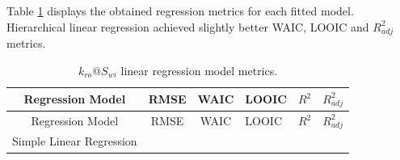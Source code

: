 \documentclass[english,msc,numbers]{coppe}
\begin{document}
  Table \ref{tab:kro-regression-metrics} displays the obtained regression metrics for each fitted model. Hierarchical linear regression achieved slightly better WAIC, LOOIC and \(R_{adj}^2\) metrics.
  \begin{longtable}[]{@{}ccclll@{}}
  \caption{\label{tab:kro-regression-metrics} \(k_{ro}@S_{wi}\) linear regression model metrics.}\tabularnewline
  \toprule
  \begin{minipage}[b]{0.36\columnwidth}\centering
  Regression Model\strut
  \end{minipage} & \begin{minipage}[b]{0.08\columnwidth}\centering
  RMSE\strut
  \end{minipage} & \begin{minipage}[b]{0.11\columnwidth}\centering
  WAIC\strut
  \end{minipage} & \begin{minipage}[b]{0.09\columnwidth}\raggedright
  LOOIC\strut
  \end{minipage} & \begin{minipage}[b]{0.06\columnwidth}\raggedright
  \(R^2\)\strut
  \end{minipage} & \begin{minipage}[b]{0.13\columnwidth}\raggedright
  \(R_{adj}^2\)\strut
  \end{minipage}\tabularnewline
  \midrule
  \endfirsthead
  \toprule
  \begin{minipage}[b]{0.36\columnwidth}\centering
  Regression Model\strut
  \end{minipage} & \begin{minipage}[b]{0.08\columnwidth}\centering
  RMSE\strut
  \end{minipage} & \begin{minipage}[b]{0.11\columnwidth}\centering
  WAIC\strut
  \end{minipage} & \begin{minipage}[b]{0.09\columnwidth}\raggedright
  LOOIC\strut
  \end{minipage} & \begin{minipage}[b]{0.06\columnwidth}\raggedright
  \(R^2\)\strut
  \end{minipage} & \begin{minipage}[b]{0.13\columnwidth}\raggedright
  \(R_{adj}^2\)\strut
  \end{minipage}\tabularnewline
  \midrule
  \endhead
  \begin{minipage}[t]{0.36\columnwidth}\centering
  Simple Linear Regression\strut
  \end{minipage} & \begin{minipage}[t]{0.08\columnwidth}\centering

\end{minipage}
\end{longtable}
\end{document}
